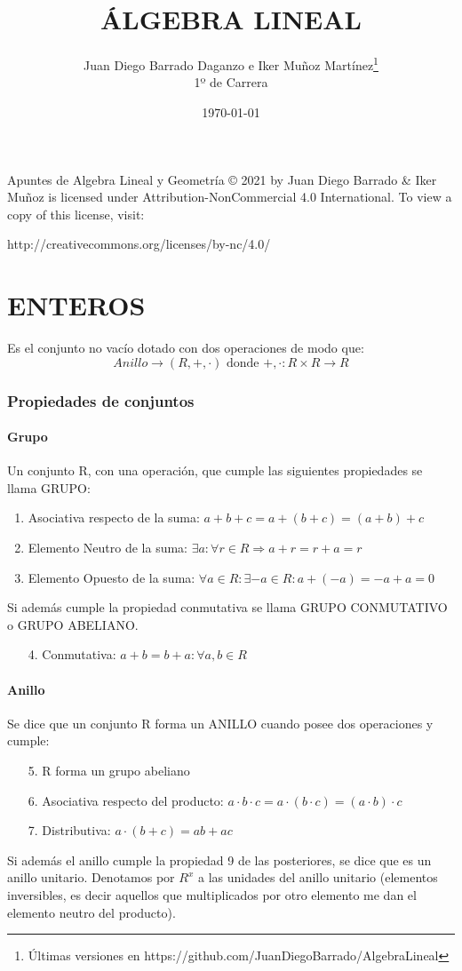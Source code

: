 \documentclass[10pt,a4paper,openright]{book}
\title{ÁLGEBRA LINEAL}
\author{Juan Diego Barrado Daganzo e Iker Muñoz Martínez\footnote{Últimas versiones en https://github.com/JuanDiegoBarrado/AlgebraLineal}\\1º de Carrera} %
\date{\today}
\theoremstyle{break}
\begin{document}
\maketitle

Apuntes de Algebra Lineal y Geometría © 2021 by Juan Diego Barrado \& Iker Muñoz is licensed under Attribution-NonCommercial 4.0 International. To view a copy of this license, visit:
\begin{center}
http://creativecommons.org/licenses/by-nc/4.0/
\end{center}

\mainmatter
\chapter*{ENTEROS}
Es el conjunto no vacío dotado con dos operaciones de modo que:
$$Anillo \rightarrow (R,+,\cdot)\mbox{ donde }+,\cdot : R\times R \rightarrow R$$
\subsection{Propiedades de conjuntos}
\subsubsection*{Grupo}
Un conjunto R, con una operación, que cumple las siguientes propiedades se llama GRUPO:
\begin{enumerate}
\item Asociativa respecto de la suma: $a+b+c=a+(b+c)=(a+b)+c$
\item Elemento Neutro de la suma: $\exists a : \forall r \in R \Rightarrow a+r=r+a=r$
\item Elemento Opuesto de la suma: $\forall a \in R : \exists -a\in R : a+(-a)=-a+a=0$
\end{enumerate}
Si además cumple la propiedad conmutativa se llama GRUPO CONMUTATIVO o GRUPO ABELIANO.
\begin{enumerate}
\item[4.] Conmutativa: $a+b=b+a: \forall a,b\in R $
\end{enumerate}

\subsubsection*{Anillo}
Se dice que un conjunto R forma un ANILLO cuando posee dos operaciones y cumple:
\begin{enumerate}
\item [5.]R forma un grupo abeliano
\item [6.]Asociativa respecto del producto: $a\cdot b\cdot c=a\cdot(b\cdot c)=(a\cdot b)\cdot c$
\item [7.]Distributiva: $a\cdot(b+c)=ab+ac$
\end{enumerate}
Si además el anillo cumple la propiedad 9 de las posteriores, se dice que es un anillo unitario. Denotamos por $R^{x}$ a las unidades del anillo unitario (elementos inversibles, es decir aquellos que multiplicados por otro elemento me dan el elemento neutro del producto).
\end{document}
